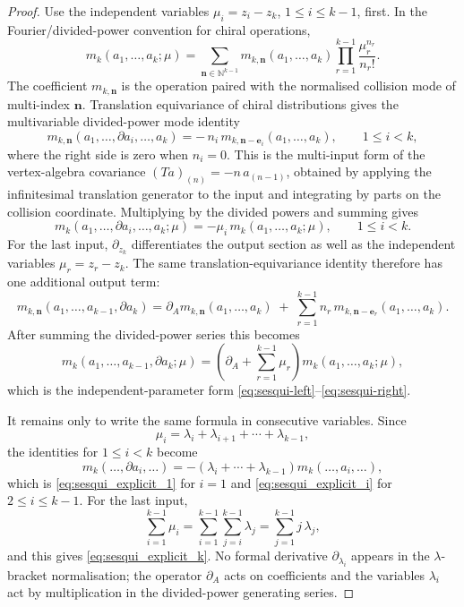\begin{proof}
Use the independent variables
\(\mu_i=z_i-z_k\), \(1\le i\le k-1\), first.  In the
Fourier/divided-power convention for chiral operations,
\[
m_k(a_1,\ldots,a_k;\mu)
=
\sum_{\mathbf n\in\mathbb N^{k-1}}
m_{k,\mathbf n}(a_1,\ldots,a_k)
\prod_{r=1}^{k-1}\frac{\mu_r^{n_r}}{n_r!}.
\]
The coefficient \(m_{k,\mathbf n}\) is the operation paired with the
normalised collision mode of multi-index \(\mathbf n\). Translation
equivariance of chiral distributions gives the multivariable
divided-power mode identity
\[
m_{k,\mathbf n}(a_1,\ldots,\partial a_i,\ldots,a_k)
=
-\,n_i\,m_{k,\mathbf n-\mathbf e_i}(a_1,\ldots,a_k),
\qquad 1\le i<k,
\]
where the right side is zero when \(n_i=0\).  This is the
multi-input form of the vertex-algebra covariance
\((T a)_{(n)}=-n\,a_{(n-1)}\), obtained by applying the
infinitesimal translation generator to the input and integrating by
parts on the collision coordinate. Multiplying by the divided powers
and summing gives
\[
m_k(a_1,\ldots,\partial a_i,\ldots,a_k;\mu)
=-\mu_i\,m_k(a_1,\ldots,a_k;\mu),
\qquad 1\le i<k.
\]
For the last input, \(\partial_{z_k}\) differentiates the output
section as well as the independent variables
\(\mu_r=z_r-z_k\). The same translation-equivariance identity
therefore has one additional output term:
\[
m_{k,\mathbf n}(a_1,\ldots,a_{k-1},\partial a_k)
=
\partial_A m_{k,\mathbf n}(a_1,\ldots,a_k)
\;+\;
\sum_{r=1}^{k-1} n_r\,
m_{k,\mathbf n-\mathbf e_r}(a_1,\ldots,a_k).
\]
After summing the divided-power series this becomes
\[
m_k(a_1,\ldots,a_{k-1},\partial a_k;\mu)
=
\left(\partial_A+\sum_{r=1}^{k-1}\mu_r\right)
m_k(a_1,\ldots,a_k;\mu),
\]
which is the independent-parameter form
\eqref{eq:sesqui-left}--\eqref{eq:sesqui-right}.

It remains only to write the same formula in consecutive variables.
Since
\[
\mu_i=\lambda_i+\lambda_{i+1}+\cdots+\lambda_{k-1},
\]
the identities for \(1\le i<k\) become
\[
m_k(\ldots,\partial a_i,\ldots)
=-(\lambda_i+\cdots+\lambda_{k-1})m_k(\ldots,a_i,\ldots),
\]
which is \eqref{eq:sesqui_explicit_1} for \(i=1\) and
\eqref{eq:sesqui_explicit_i} for \(2\le i\le k-1\).  For the last
input,
\[
\sum_{i=1}^{k-1}\mu_i
=
\sum_{i=1}^{k-1}\sum_{j=i}^{k-1}\lambda_j
=
\sum_{j=1}^{k-1} j\,\lambda_j,
\]
and this gives \eqref{eq:sesqui_explicit_k}.  No formal derivative
\(\partial_{\lambda_i}\) appears in the \(\lambda\)-bracket
normalisation; the operator \(\partial_A\) acts on coefficients and
the variables \(\lambda_i\) act by multiplication in the divided-power
generating series.
\end{proof}
